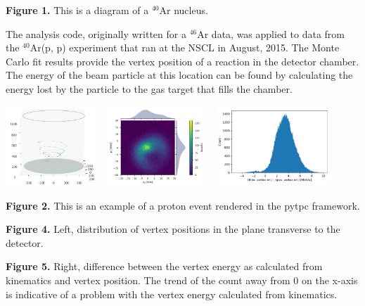 \documentclass[ansiepaper,portrait]{baposter}
\begin{document}
\begin{poster}
{\small{\textbf{Figure 1.} This is a diagram of a $^{40}$Ar nucleus.}
}
{\small{The analysis code, originally written for a $^{46}$Ar data, was applied to data from the $^{40}$Ar(p, p) experiment that ran at the NSCL in August,  2015.}
\small{The Monte Carlo fit results provide the vertex position of a reaction in the detector chamber. The energy of the beam particle at this location can be found by calculating the energy lost by the particle to the gas target that fills the chamber.}

\begin{center}
\includegraphics[height=30mm]{chamber_plot.png}
\hspace{.5cm}
\includegraphics [height=30mm, width=43mm] {vertex_pos_distrib.pdf}
\hspace{.5cm}
\includegraphics [height=30mm, width=43mm] {vertex_en_error.pdf}
\end{center}

\small{\textbf{Figure 2.} This is an example of a proton event rendered in the pytpc framework.}

\small{\textbf{Figure 4.} Left, distribution of vertex positions in the plane transverse to the detector.}

\small{\textbf{Figure 5.} Right, difference between the vertex energy as calculated from kinematics and vertex position. The trend of the count away from 0 on the x-axis is indicative of a problem with the vertex energy calculated from kinematics.}

}
\end{poster}
\end{document}
